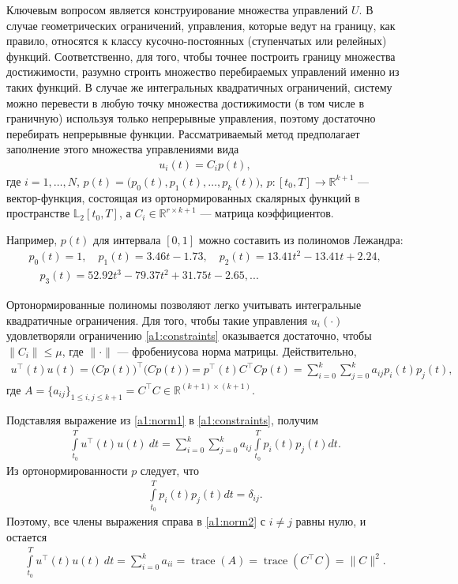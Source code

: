 \documentclass[../main.tex]{subfiles}
\begin{document}
Ключевым вопросом является конструирование множества управлений $U$.
 В случае геометрических ограничений, управления, которые ведут на границу, как правило, относятся к классу кусочно-постоянных (ступенчатых или релейных) функций.
 Соответственно, для того, чтобы точнее построить границу множества достижимости, разумно строить множество перебираемых управлений именно из таких функций. 
 В случае же интегральных квадратичных ограничений, систему можно перевести в любую точку множества достижимости (в том числе в граничную) используя только непрерывные управления, поэтому достаточно перебирать непрерывные функции. 
 Рассматриваемый метод предполагает заполнение этого множества управлениями вида 
 \begin{gather}\label{a1:control}
 	u_i(t) = C_i p (t),
 \end{gather}
 где $ i = 1, \dots, N$, $p(t) = \big(p_{0}(t),p_{1}(t),\dots,p_{k}(t)\big)$, $p: [t_0, {T}] \rightarrow \mathbb{R}^{k+1} $ --- вектор-функция, состоящая из ортонормированных скалярных функций в пространстве $\mathbb{L}_2[t_0, {T}]$, а $C_i \in \mathbb{R}^{r \times k+1}$ --- матрица коэффициентов. 
	 
 Например, $p(t)$ для интервала $[0,1]$ можно составить из полиномов Лежандра:
 \begin{gather*}
 	p_0(t) = 1, \quad p_1(t) = 3.46t-1.73, \quad p_2(t) = 13.41t^2 - 13.41t + 2.24, \\ \quad 
 	p_3(t) = 52.92t^3 - 79.37t^2+31.75t -2.65, ...
 \end{gather*}
 
 Ортонормированные полиномы позволяют легко учитывать интегральные квадратичные ограничения.
 Для того, чтобы такие управления $u_i(\cdot)$ удовлетворяли ограничению \eqref{a1:constraints} оказывается достаточно, чтобы $\|C_i\| \leqslant \mu$, где $\|\cdot\| $ --- фробениусова норма матрицы.
 Действительно,
 \begin{gather}\label{a1:norm1}
 	 u^{\top}(t) u(t) = \big(C p(t)\big)^{\top} \big(C p(t)\big) = p^{\top}(t) C^{\top} C p(t) = \sum_{i=0}^k \sum_{j=0}^k a_{ij} p_i(t) p_j(t),
 \end{gather}
 где $ A = \{a_{ij}\}_{1\leqslant i,j \leqslant k + 1} = C^{\top} C \in \mathbb{R}^{(k+1) × (k+1)} $.
 
 Подставляя выражение из \eqref{a1:norm1} в \eqref{a1:constraints}, получим
 \begin{gather}\label{a1:norm2}
 		\int\limits_{t_0}^T u^{\top}(t) u(t) \ dt = \sum_{i=0}^k \sum_{j=0}^k a_{ij} \int\limits_{t_0}^T p_i(t) p_j(t) dt.
 \end{gather}
 Из ортонормированности $p$ следует, что 
 \begin{gather}
 	\int\limits_{t_0}^T p_i(t) p_j(t) dt = \delta_{ij}. 
 \end{gather}
 Поэтому, все члены выражения справа в \eqref{a1:norm2} с $i \neq j$ равны нулю, и остается 
 \begin{gather}
 	\int\limits_{t_0}^T u^{\top}(t) u(t) \ dt = \sum_{i=0}^k a_{ii} = \operatorname{trace}(A) = \operatorname{trace}(C^{\top} C) = \| C\|^2.
 \end{gather}
 
\end{document}
